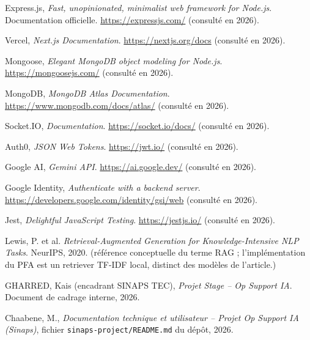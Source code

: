 Express.js, \textit{Fast, unopinionated, minimalist web framework for Node.js}. Documentation officielle. \url{https://expressjs.com/} (consulté en 2026).

Vercel, \textit{Next.js Documentation}. \url{https://nextjs.org/docs} (consulté en 2026).

Mongoose, \textit{Elegant MongoDB object modeling for Node.js}. \url{https://mongoosejs.com/} (consulté en 2026).

MongoDB, \textit{MongoDB Atlas Documentation}. \url{https://www.mongodb.com/docs/atlas/} (consulté en 2026).

Socket.IO, \textit{Documentation}. \url{https://socket.io/docs/} (consulté en 2026).

Auth0, \textit{JSON Web Tokens}. \url{https://jwt.io/} (consulté en 2026).

Google AI, \textit{Gemini API}. \url{https://ai.google.dev/} (consulté en 2026).

Google Identity, \textit{Authenticate with a backend server}. \url{https://developers.google.com/identity/gsi/web} (consulté en 2026).

Jest, \textit{Delightful JavaScript Testing}. \url{https://jestjs.io/} (consulté en 2026).

Lewis, P. et al. \textit{Retrieval-Augmented Generation for Knowledge-Intensive NLP Tasks}. NeurIPS, 2020. (référence conceptuelle du terme RAG ; l'implémentation du PFA est un retriever TF-IDF local, distinct des modèles de l'article.)

GHARRED, Kais (encadrant SINAPS TEC), \textit{Projet Stage -- Op Support IA}. Document de cadrage interne, 2026.

Chaabene, M., \textit{Documentation technique et utilisateur -- Projet Op Support IA (Sinaps)}, fichier \texttt{sinaps-project/README.md} du dépôt, 2026.
